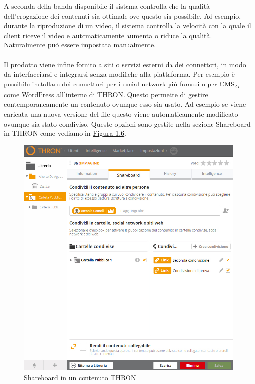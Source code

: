 \documentclass[a4paper, 12pt, twoside, openright]{book}
\newcommand{\gloss}[1]{#1\textsubscript{\textit{\tiny{G}}}}
\begin{document}
A seconda della banda disponibile il sistema controlla che la qualità dell'erogazione dei contenuti sia ottimale ove questo sia possibile. Ad esempio, durante la riproduzione di un video, il sistema controlla la velocità con la quale il client riceve il video e automaticamente aumenta o riduce la qualità. Naturalmente può essere impostata manualmente.\\ \\
Il prodotto viene infine fornito a siti o servizi esterni da dei connettori, in modo da interfacciarsi e integrarsi senza modifiche alla piattaforma. Per esempio è possibile installare dei connettori per i social network più famosi o per \gloss{CMS} come WordPress all'interno di THRON. Questo permette di gestire contemporaneamente un contenuto ovunque esso sia usato. Ad esempio se viene caricata una nuova versione del file questo viene automaticamente modificato ovunque sia stato condiviso. Queste opzioni sono gestite nella sezione Shareboard in THRON come vediamo in \hyperref[content-shareboard]{Figura 1.6}.\\ 
\begin{figure}[H]
	\centering
	\label{content-shareboard}
	\includegraphics[width=1.0\textwidth]{images/content-shareboard.jpg}
	\caption{Shareboard in un contenuto THRON}
\end{figure}
\end{document}
